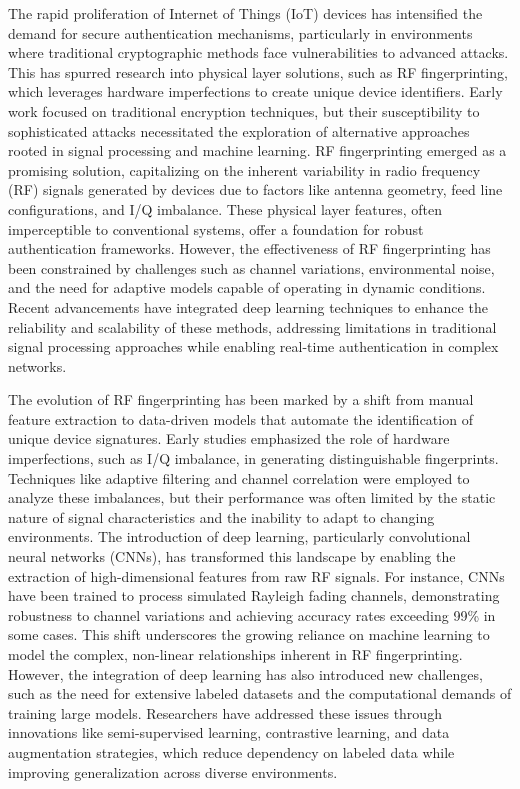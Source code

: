 \documentclass[conference]{IEEEtran}
\begin{document}
The rapid proliferation of Internet of Things (IoT) devices has intensified the demand for secure authentication mechanisms, particularly in environments where traditional cryptographic methods face vulnerabilities to advanced attacks. This has spurred research into physical layer solutions, such as RF fingerprinting, which leverages hardware imperfections to create unique device identifiers. Early work focused on traditional encryption techniques, but their susceptibility to sophisticated attacks necessitated the exploration of alternative approaches rooted in signal processing and machine learning. RF fingerprinting emerged as a promising solution, capitalizing on the inherent variability in radio frequency (RF) signals generated by devices due to factors like antenna geometry, feed line configurations, and I/Q imbalance. These physical layer features, often imperceptible to conventional systems, offer a foundation for robust authentication frameworks. However, the effectiveness of RF fingerprinting has been constrained by challenges such as channel variations, environmental noise, and the need for adaptive models capable of operating in dynamic conditions. Recent advancements have integrated deep learning techniques to enhance the reliability and scalability of these methods, addressing limitations in traditional signal processing approaches while enabling real-time authentication in complex networks.  

The evolution of RF fingerprinting has been marked by a shift from manual feature extraction to data-driven models that automate the identification of unique device signatures. Early studies emphasized the role of hardware imperfections, such as I/Q imbalance, in generating distinguishable fingerprints. Techniques like adaptive filtering and channel correlation were employed to analyze these imbalances, but their performance was often limited by the static nature of signal characteristics and the inability to adapt to changing environments. The introduction of deep learning, particularly convolutional neural networks (CNNs), has transformed this landscape by enabling the extraction of high-dimensional features from raw RF signals. For instance, CNNs have been trained to process simulated Rayleigh fading channels, demonstrating robustness to channel variations and achieving accuracy rates exceeding 99\% in some cases. This shift underscores the growing reliance on machine learning to model the complex, non-linear relationships inherent in RF fingerprinting. However, the integration of deep learning has also introduced new challenges, such as the need for extensive labeled datasets and the computational demands of training large models. Researchers have addressed these issues through innovations like semi-supervised learning, contrastive learning, and data augmentation strategies, which reduce dependency on labeled data while improving generalization across diverse environments.  
\end{document}
